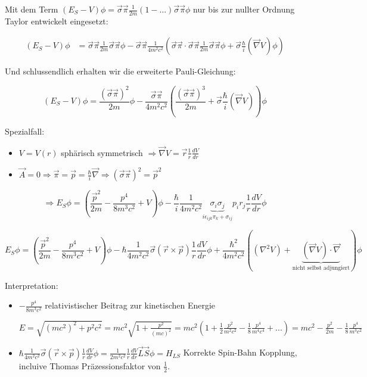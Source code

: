 Mit dem Term \((E_S-V)\phi = \vec\sigma\vec\pi \frac{1}{2m} (1-...)\vec\sigma\vec\pi\phi\) nur bis zur nullter Ordnung Taylor entwickelt eingesetzt:

\begin{align}
(E_S-V)\phi &= \vec\sigma\vec\pi \frac{1}{2m}\vec\sigma\vec\pi\phi -\vec\sigma\vec\pi \frac{1}{4m^2c^2}\left( \vec\sigma\vec\pi\cdot\vec\sigma\vec\pi \frac{1}{2m} \vec\sigma\vec\pi\phi   +\vec\sigma\frac{\hbar}{i}(\vec\nabla V)\phi\right) 
\end{align}

Und schlussendlich erhalten wir die erweiterte Pauli-Gleichung:

\[(E_S-V)\phi = \frac{(\vec\sigma\vec\pi)^2}{2m}\phi - \frac{\vec\sigma\vec\pi}{4m^2c^2}\left(\frac{(\vec\sigma\vec\pi)^3}{2m} +\vec\sigma \frac{\hbar}{i}(\vec\nabla V)\right)\phi \]

Spezialfall: 
\begin{itemize}
\item \(V=V(r)\) sphärisch symmetrisch \(\Rightarrow \vec\nabla V = \vec r \frac{1}{r}\frac{dV}{dr}\)
\item \(\vec A = 0 \Rightarrow \vec \pi = \vec p = \frac{\hbar}{i}\vec\nabla \Rightarrow (\vec\sigma \vec\pi)^2=\vec p^2\) 
\end{itemize}

\[\Rightarrow E_S\phi = ( \frac{\vec p^2}{2m} - \frac{p^4}{8m^3c^2}+V)\phi - \frac{\hbar}{i}\frac{1}{4m^2c^2}\underbrace{\sigma_i\sigma_j}_{i\epsilon_{ijk}\pi_k+\sigma_{ij}} p_ir_j\frac{1}{r}\frac{dV}{dr}\phi\]


\[E_S\phi = ( \frac{\vec p^2}{2m} - \frac{p^4}{8m^3c^2}+V)\phi - \hbar \frac{1}{4m^2c^2}\vec\sigma(\vec r\times\vec p)\frac{1}{r}\frac{dV}{dr}\phi + \frac{\hbar^2}{4m^2c^2}\left((\nabla^2 V)+\underbrace{(\vec\nabla V)\cdot\vec\nabla}_{\text{nicht selbst adjungiert}}  \right)\phi\]


Interpretation:

\begin{itemize}
\item  \(- \frac{p^4}{8m^3c^2}\) relativistischer Beitrag zur kinetischen Energie

\(E = \sqrt{(mc^2)^2+p^2c^2} = mc^2\sqrt{1+\frac{p^2}{(mc)^2}}= mc^2(1+\frac{1}{2}\frac{p^2}{m^2c^2}-\frac{1}{8}\frac{p^4}{m^4c^4}+...) = mc^2-\frac{p^2}{2m}-\frac{1}{8}\frac{p^4}{m^3c^2}\)

\item \( \hbar \frac{1}{4m^2c^2}\vec\sigma(\vec r\times\vec p)\frac{1}{r}\frac{dV}{dr}\phi = \frac{1}{2m^2c^2}\frac{1}{r}\frac{dV}{dr}\vec L\vec S\phi = H_{LS} \) Korrekte Spin-Bahn Kopplung, incluive Thomas Präzessionsfaktor von \(\frac{1}{2}\).
\end{itemize}



